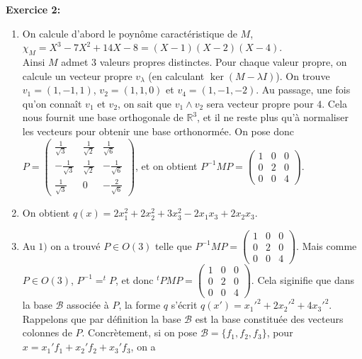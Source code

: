 \documentclass[a4paper, 10pt]{article}
\theoremstyle{plain}
\newcommand{\R}{\mathbb{R}}
\begin{document}
\bigskip
\noindent
\textbf{Exercice 2:}\\
\begin{enumerate}
\item 
On calcule d'abord le poynôme caractéristique de $M$, \\
$\chi_M = X^3-7X^2+14X-8 = (X-1)(X-2)(X-4)$. \\
Ainsi $M$ admet 3 valeurs propres distinctes. Pour chaque valeur propre, on calcule 
un vecteur propre $v_{\lambda}$ (en calculant $\ker (M-\lambda I)$). On trouve \\
$v_1 = (1,-1,1)$, $v_2 = (1,1,0)$ et 
$v_4 = (1,-1,-2)$. Au passage, une fois qu'on connaît $v_1$ et $v_2$, on sait que 
$v_1 \wedge v_2$ sera vecteur propre pour $4$. 
Cela nous fournit une base orthogonale de $\R^3$, et il ne reste plus qu'à normaliser les vecteurs 
pour obtenir une base orthonormée. 
On pose donc \\
$P =
\begin{pmatrix}
\frac{1}{\sqrt{3}}  & \frac{1}{\sqrt{2}}   & \frac{1}{\sqrt{6}}  \\[3pt]
-\frac{1}{\sqrt{3}} & \frac{1}{\sqrt{2}}   &-\frac{1}{\sqrt{6}}  \\[3pt]
\frac{1}{\sqrt{3}}         &  0                   & - \frac{2}{\sqrt{6}}
\end{pmatrix}$, et on obtient 
$P^{-1}MP = 
\begin{pmatrix}
1&0&0\\0&2&0\\0&0&4
\end{pmatrix}$.
\item On obtient 
$q(x) = 2x_1^2 +2x_2^2 +3x_3^2  -2x_1x_3 +2x_2x_3$.
\item Au $1)$ on a trouvé $P\in O(3)$ telle que 
$P^{-1}MP = 
\begin{pmatrix}
1&0&0\\0&2&0\\0&0&4
\end{pmatrix}$. Mais comme 
$P\in O(3)$, $P^{-1} = ^tP$, et donc 
$^tPMP = 
\begin{pmatrix}
1&0&0\\0&2&0\\0&0&4
\end{pmatrix}$. Cela siginifie que dans la base 
$\mathcal{B}$ 
associée à $P$, la forme $q$ s'écrit 
$q(x') = x_1'^2 + 2x_2'^2 + 4x_3'^2$. Rappelons que par définition la base 
$\mathcal{B}$ est la base constituée des vecteurs colonnes de $P$.
Concrètement, si on pose 
$\mathcal{B} = \{ f_1,f_2,f_3\}$, pour 
$x = x_1'f_1+x_2'f_2+x_3'f_3$, on a 

\end{enumerate}
\end{document}
